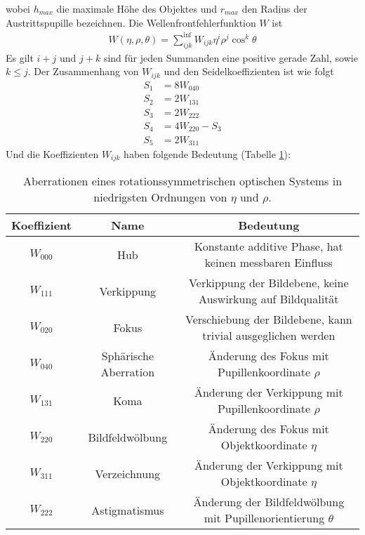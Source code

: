 \documentclass[twoside,colorback,accentcolor=tud4c,11pt]{tudreport}
\begin{document}
wobei $ h_{max} $ die maximale Höhe des Objektes
und $ r_{max} $ den Radius der Austrittspupille bezeichnen. Die Wellenfrontfehlerfunktion $W$ ist
\begin{align}
W(\eta,\rho,\theta)=\sum_{ijk}^{\inf}W_{ijk}\eta^i\rho^j\cos^k\theta
\end{align}
Es gilt $i+j$ und $j+k$ sind für jeden Summanden eine positive gerade Zahl, sowie $k\leq j$. Der Zusammenhang von $ W_{ijk} $ und den Seidelkoeffizienten ist wie folgt
\begin{align}
S_1&=8W_{040}\\
S_2&=2W_{131}\\
S_3&=2W_{222}\\
S_4&=4W_{220}-S_3\\
S_5&=2W_{311}
\end{align}
Und die Koeffizienten $ W_{ijk} $ haben folgende Bedeutung (Tabelle \ref{tab:W}):
\begin{table}[H]
\centering
\begin{tabular}{|c|c|c|}
\hline 
Koeffizient & Name & Bedeutung \\ 
\hline 
$W_{000}$ & Hub & Konstante additive Phase, hat keinen messbaren Einfluss \\ 
$W_{111}$ & Verkippung & Verkippung der Bildebene, keine Auswirkung auf Bildqualität \\ 
$W_{020}$ & Fokus & Verschiebung der Bildebene, kann trivial ausgeglichen werden \\ 
\hline 
$W_{040}$ & Sphärische Aberration & Änderung des Fokus mit Pupillenkoordinate $\rho$ \\  
$W_{131}$ & Koma & Änderung der Verkippung mit Pupillenkoordinate $\rho$ \\
$W_{220}$ & Bildfeldwölbung & Änderung des Fokus mit Objektkoordinate $\eta$ \\
$W_{311}$ & Verzeichnung & Änderung der Verkippung mit Objektkoordinate $\eta$ \\ 
$W_{222}$ & Astigmatismus & Änderung der Bildfeldwölbung mit Pupillenorientierung $\theta$ \\ 
\hline 
\end{tabular} 
\caption{Aberrationen eines rotationssymmetrischen optischen Systems in niedrigsten Ordnungen von $\eta$ und $\rho$. \cite{anl}} \label{tab:W}
\end{table}
\end{document}
